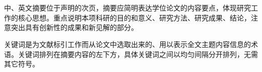 \begin{titlepage}

    \pagestyle{empty}

    \begin{spacing}{1.05}
        \centering
        \parbox[c]{.75\textwidth}{}
    \end{spacing}

    \begin{spacing}{1.5}
        \centering
        \sanhao\quad{} \\ 
         \\ 
    \end{spacing}
    \xiaosanhao\quad{}

    \normalsize

    中、英文摘要位于声明的次页，摘要应简明表达学位论文的内容要点，体现研究工作的核心思想。重点说明本项科研的目的和意义、研究方法、研究成果、结论，注意突出具有创新性的成果和新见解的部分。

    关键词是为文献标引工作而从论文中选取出来的、用以表示全文主题内容信息的术语。关键词排列在摘要内容的左下方，具体关键词之间以均匀间隔分开排列，无需其它符号。

    

    \quad{}

    \par\noindent{}\quad{}%
\end{titlepage}

\thispagestyle{empty}

